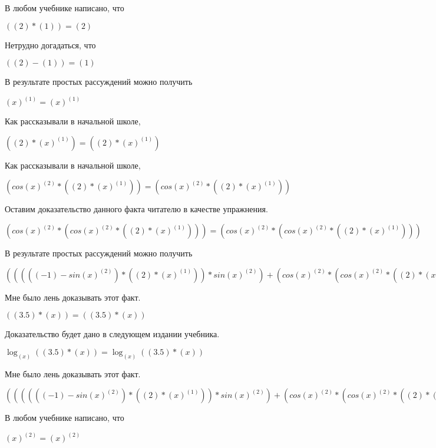 \documentclass[12pt,a4paper,fleqn]{article}
\theoremstyle{definition}
\begin{document}
В любом учебнике написано, что

$(( 2 ) * ( 1 )) = ( 2 )$

Нетрудно догадаться, что

$(( 2 ) - ( 1 )) = ( 1 )$

В результате простых рассуждений можно получить

${( x )}^{( 1 )} = {( x )}^{( 1 )}$

Как рассказывали в начальной школе,

$(( 2 ) * {( x )}^{( 1 )}) = (( 2 ) * {( x )}^{( 1 )})$

Как рассказывали в начальной школе,

$(cos{( x )}^{( 2 )} * (( 2 ) * {( x )}^{( 1 )})) = (cos{( x )}^{( 2 )} * (( 2 ) * {( x )}^{( 1 )}))$

Оставим доказательство данного факта читателю в качестве упражнения.

$(cos{( x )}^{( 2 )} * (cos{( x )}^{( 2 )} * (( 2 ) * {( x )}^{( 1 )}))) = (cos{( x )}^{( 2 )} * (cos{( x )}^{( 2 )} * (( 2 ) * {( x )}^{( 1 )})))$

В результате простых рассуждений можно получить

$((((( -1 ) - sin{( x )}^{( 2 )}) * (( 2 ) * {( x )}^{( 1 )})) * sin{( x )}^{( 2 )}) + (cos{( x )}^{( 2 )} * (cos{( x )}^{( 2 )} * (( 2 ) * {( x )}^{( 1 )})))) = ((((( -1 ) - sin{( x )}^{( 2 )}) * (( 2 ) * {( x )}^{( 1 )})) * sin{( x )}^{( 2 )}) + (cos{( x )}^{( 2 )} * (cos{( x )}^{( 2 )} * (( 2 ) * {( x )}^{( 1 )}))))$

Мне было лень доказывать этот факт.

$(( 3.5 ) * ( x )) = (( 3.5 ) * ( x ))$

Доказательство будет дано в следующем издании учебника.

$\log_{( x )}{(( 3.5 ) * ( x ))} = \log_{( x )}{(( 3.5 ) * ( x ))}$

Мне было лень доказывать этот факт.

$(((((( -1 ) - sin{( x )}^{( 2 )}) * (( 2 ) * {( x )}^{( 1 )})) * sin{( x )}^{( 2 )}) + (cos{( x )}^{( 2 )} * (cos{( x )}^{( 2 )} * (( 2 ) * {( x )}^{( 1 )})))) * \log_{( x )}{(( 3.5 ) * ( x ))}) = (((((( -1 ) - sin{( x )}^{( 2 )}) * (( 2 ) * {( x )}^{( 1 )})) * sin{( x )}^{( 2 )}) + (cos{( x )}^{( 2 )} * (cos{( x )}^{( 2 )} * (( 2 ) * {( x )}^{( 1 )})))) * \log_{( x )}{(( 3.5 ) * ( x ))})$

В любом учебнике написано, что

${( x )}^{( 2 )} = {( x )}^{( 2 )}$
\end{document}
